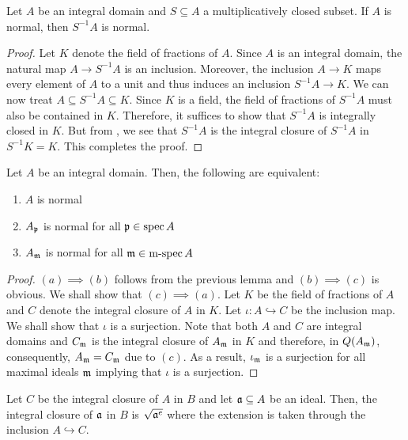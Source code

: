 \begin{lemma}
    Let $A$ be an integral domain and $S\subseteq A$ a multiplicatively closed subset. If $A$ is normal, then $S^{-1}A$ is normal.
\end{lemma}
\begin{proof}
    Let $K$ denote the field of fractions of $A$. Since $A$ is an integral domain, the natural map $A\to S^{-1}A$ is an inclusion. Moreover, the inclusion $A\to K$ maps every element of $A$ to a unit and thus induces an inclusion $S^{-1}A\to K$. We can now treat $A\subseteq S^{-1}A\subseteq K$. Since $K$ is a field, the field of fractions of $S^{-1}A$ must also be contained in $K$. Therefore, it suffices to show that $S^{-1}A$ is integrally closed in $K$. But from , we see that $S^{-1}A$ is the integral closure of $S^{-1}A$ in $S^{-1}K = K$. This completes the proof.
\end{proof}

\begin{proposition}
    Let $A$ be an integral domain. Then, the following are equivalent: 
    \begin{enumerate}
        \item $A$ is normal 
        \item $A_\mathfrak p$ is normal for all $\mathfrak p\in\operatorname{spec} A$ 
        \item $A_\mathfrak m$ is normal for all $\mathfrak m\in\operatorname{m-spec} A$
    \end{enumerate}
\end{proposition}
\begin{proof}
    $(a)\implies(b)$ follows from the previous lemma and $(b)\implies(c)$ is obvious. We shall show that $(c)\implies(a)$. Let $K$ be the field of fractions of $A$ and $C$ denote the integral closure of $A$ in $K$. Let $\iota:A\hookrightarrow C$ be the inclusion map. We shall show that $\iota$ is a surjection. Note that both $A$ and $C$ are integral domains and $C_\mathfrak m$ is the integral closure of $A_\mathfrak m$ in $K$ and therefore, in $Q(A_\mathfrak m)$, consequently, $A_\mathfrak m = C_\mathfrak m$ due to $(c)$. As a result, $\iota_\mathfrak m$ is a surjection for all maximal ideals $\mathfrak m$ implying that $\iota$ is a surjection.
\end{proof}

\begin{lemma}
    Let $C$ be the integral closure of $A$ in $B$ and let $\mathfrak a\subseteq A$ be an ideal. Then, the integral closure of $\mathfrak a$ in $B$ is $\sqrt{\mathfrak a^e}$ where the extension is taken through the inclusion $A\hookrightarrow C$.
\end{lemma}

